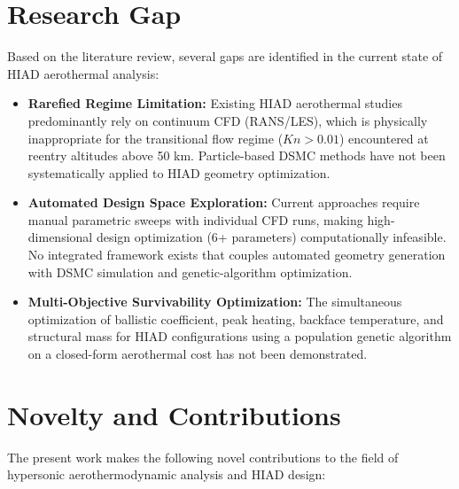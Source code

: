 \section{Research Gap}
Based on the literature review, several gaps are identified in the current state of HIAD aerothermal analysis:
\begin{itemize}
    \item \textbf{Rarefied Regime Limitation:} Existing HIAD aerothermal studies predominantly rely on continuum CFD (RANS/LES), which is physically inappropriate for the transitional flow regime ($Kn > 0.01$) encountered at reentry altitudes above 50 km. Particle-based DSMC methods have not been systematically applied to HIAD geometry optimization.

    \item \textbf{Automated Design Space Exploration:} Current approaches require manual parametric sweeps with individual CFD runs, making high-dimensional design optimization (6+ parameters) computationally infeasible. No integrated framework exists that couples automated geometry generation with DSMC simulation and genetic-algorithm optimization.


    \item \textbf{Multi-Objective Survivability Optimization:} The simultaneous optimization of ballistic coefficient, peak heating, backface temperature, and structural mass for HIAD configurations using a population genetic algorithm on a closed-form aerothermal cost has not been demonstrated.
\end{itemize}

\section{Novelty and Contributions}
The present work makes the following novel contributions to the field of hypersonic aerothermodynamic analysis and HIAD design:

